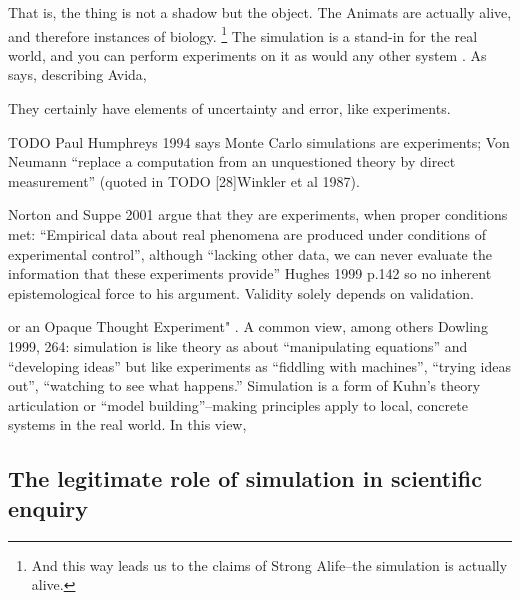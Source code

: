 That is, the thing is not a shadow but the object. The Animats are
actually alive, and therefore instances of biology.
\footnote{And this way leads us to the claims of Strong Alife--the simulation is actually alive.}
The simulation is a stand-in for the real world, and you can perform
experiments on it as would any other system
\autocite[31]{Winsberg2010}. As \autocite{Adami2002} says, describing
Avida,


They certainly have elements of uncertainty and error, like experiments.

TODO Paul Humphreys 1994 says Monte Carlo simulations are experiments; Von
Neumann ``replace a computation from an unquestioned theory by direct
measurement'' (quoted in TODO [28]{Winkler et al 1987}).

Norton and Suppe 2001 argue that they are experiments, when proper conditions met:
``Empirical
data about real phenomena are produced under conditions of experimental
control'', although ``lacking other data, we can never evaluate the
information that these experiments provide'' Hughes 1999 p.142 so no inherent epistemological force to his
argument. Validity solely depends on validation.

\label{a-third-way-neither-experimental-or-theoretical}

\autocite[31]{Winsberg2010} or an Opaque Thought Experiment"
\autocite{DiPaolo2000}. A common view, among others Dowling 1999, 264:
simulation is like theory as about ``manipulating equations'' and
``developing ideas'' but like experiments as ``fiddling with machines'',
``trying ideas out'', ``watching to see what happens.'' Simulation is a
form of Kuhn's theory articulation or ``model building''--making
principles apply to local, concrete systems in the real world. In this
view, 

\subsection{The legitimate role of simulation in scientific
	enquiry}\label{the-legitimate-role-of-simulation-in-scientific-enquiry}

